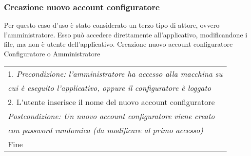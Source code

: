 \begin{minipage}{\textwidth}
    \subsubsection{Creazione nuovo account configuratore}
    Per questo caso d'uso è stato considerato un terzo tipo di attore, ovvero
    l'amministratore. Esso può accedere direttamente all'applicativo, modificandone
    i file, ma non è utente dell'applicativo.
    \usecase
        {Creazione nuovo account configuratore}
        {Configuratore o Amministratore}
        {
            \begin{tabular}{l}
                1. \textit{Precondizione: l'amministratore ha accesso alla macchina su}\\
                \textit{cui è eseguito l'applicativo, oppure il configuratore è loggato}\\
                2. L'utente inserisce il nome del nuovo account configuratore\\
                \textit{Postcondizione: Un nuovo account configuratore viene creato} \\
                \textit{con password randomica (da modificare al primo accesso)}\\
                Fine
            \end{tabular} \\
            
        }
        \vspace{0.5cm}
\end{minipage}